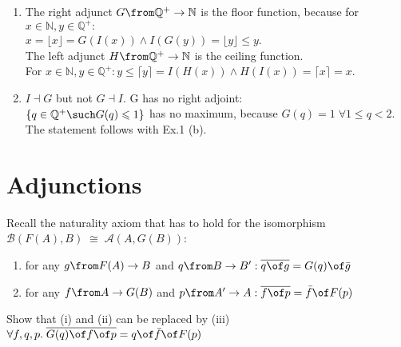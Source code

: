 	\begin{answer}
		\begin{enumerate} 
			\item The right adjunct $G \from \mathbb{Q}^+ \to  \mathbb{N}$ is the floor function, because for $x \in \mathbb{N}, y \in \mathbb{Q}^+:$
			\\$ x = \lfloor x \rfloor = G(I(x))  \land I(G(y)) =  \lfloor y \rfloor \leqslant y$.
			\\The left adjunct $H \from \mathbb{Q}^+ \to  \mathbb{N}$ is the ceiling function.\\ For $x \in \mathbb{N}, y \in \mathbb{Q}^+: y \leqslant \lceil y \rceil = I(H(x))  \land H(I(x)) =  \lceil x \rceil = x$.\\
			
			\item $I \dashv G$ but not $G \dashv I$. G has no right adjoint:
			\\$\{q\in \mathbb{Q}^+ \such G(q) \leqslant 1\} $ has no maximum, because $G(q)= 1 \; \forall 1 \leqslant q < 2$. 
			The statement follows with Ex.1 (b).
		\end{enumerate}
	\end{answer}
	
	
	\section{Adjunctions}
	
	\begin{exercise}
		Recall the naturality axiom that has to hold for the isomorphism $\mathscr{B}(F(A), B) \; \cong \; \mathscr{A}(A, G(B)) $:
		
		\begin{enumerate}[label=(\roman*)]
			\item for any $g \from F(A) \to B$ and $q \from B \to B': \overline{q \of g} = G(q) \of \bar{g} $
			\item for any $f \from A \to G(B) $ and $ p \from A' \to A: \overline{f \of p} = \bar{f} \of F(p)$
		\end{enumerate}
		Show that (i) and (ii) can be replaced by (iii) $\forall f, q, p. \;\overline{G(q) \of f \of p} = q \of \bar{f} \of F(p)$
	\end{exercise}
	
